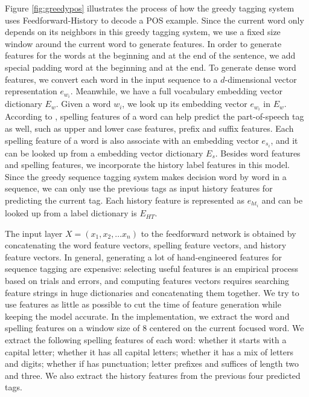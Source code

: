 Figure \ref{fig:greedypos} illustrates the process of how the greedy tagging system uses Feedforward-History to decode a POS example. Since the current word only depends on its neighbors in this greedy tagging system, we use a fixed size window around the current word to generate features. In order to generate features for the words at the beginning and at the end of the sentence, we add special padding word at the beginning and at the end. To generate dense word features, we convert each word in the input sequence to a $d$-dimensional vector representation $e_{w_{i}}$. Meanwhile, we have a full vocabulary embedding vector dictionary $E_{w}$. Given a word $w_{i}$, we look up its embedding vector $e_{w_{i}}$ in $E_{w}$. According to \cite{ratnaparkhi1996maximum}, spelling features of a word can help predict the part-of-speech tag as well, such as upper and lower case features, prefix and suffix features. Each spelling feature of a word is also associate with an embedding vector $e_{s_{i}}$, and it can be looked up from a embedding vector dictionary $E_{s}$. Besides word features and spelling features, we incorporate the history label features in this model. Since the greedy sequence tagging system makes decision word by word in a sequence, we can only use the previous tags as input history features for predicting the current tag. Each history feature is represented as $e_{ht_{i}}$ and can be looked up from a label dictionary is $E_{HT}$.

The input layer $X=\left( x_{1},x_{2},\ldots x_{n}\right)$ to the feedforward network is obtained by concatenating the word feature vectors, spelling feature vectors, and history feature vectors. In general, generating a lot of hand-engineered features for sequence tagging are expensive: selecting useful features is an empirical process based on trials and errors, and computing features vectors requires searching feature strings in huge dictionaries and concatenating them together. We try to use features as little as possible to cut the time of feature generation while keeping the model accurate. In the implementation, we extract the word and spelling features on a window size of 8 centered on the current focused word. We extract the following spelling features of each word: whether it starts with a capital letter; whether it has all capital letters; whether it has a mix of letters and digits; whether if has punctuation; letter prefixes and suffices of length two and three. We also extract the history features from the previous four predicted tags. 

